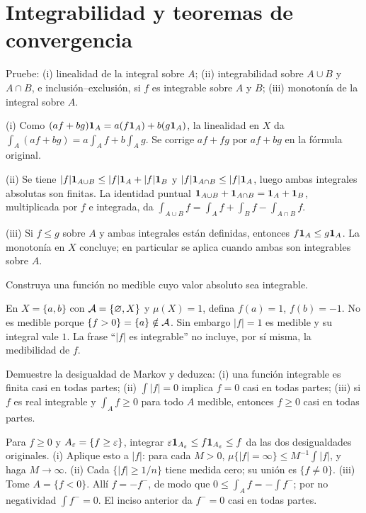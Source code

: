 \chapter{Integrabilidad y teoremas de convergencia}

\begin{ejercicio}\label{ej:v2-l09-1}
Pruebe: (i) linealidad de la integral sobre $A$; (ii) integrabilidad sobre $A\cup B$ y $A\cap B$, e inclusión--exclusión, si $f$ es integrable sobre $A$ y $B$; (iii) monotonía de la integral sobre $A$.
\end{ejercicio}
\begin{solucion}
(i) Como $(af+bg)\mathbf1_{A}=a(f\mathbf1_{A})+b(g\mathbf1_{A})$, la linealidad en $X$ da $\int_A(af+bg)=a\int_Af+b\int_Ag$. Se corrige $af+fg$ por $af+bg$ en la fórmula original.

(ii) Se tiene $|f|\mathbf1_{A\cup B}\le|f|\mathbf1_{A}+|f|\mathbf1_{B}$ y $|f|\mathbf1_{A\cap B}\le|f|\mathbf1_{A}$, luego ambas integrales absolutas son finitas. La identidad puntual $\mathbf1_{A\cup B}+\mathbf1_{A\cap B}=\mathbf1_{A}+\mathbf1_{B}$, multiplicada por $f$ e integrada, da $\int_{A\cup B}f=\int_Af+\int_Bf-\int_{A\cap B}f$.

(iii) Si $f\le g$ sobre $A$ y ambas integrales están definidas, entonces $f\mathbf1_{A}\le g\mathbf1_{A}$. La monotonía en $X$ concluye; en particular se aplica cuando ambas son integrables sobre $A$.
\end{solucion}

\begin{ejercicio}\label{ej:v2-l09-2}
Construya una función no medible cuyo valor absoluto sea integrable.
\end{ejercicio}
\begin{solucion}
En $X=\{a,b\}$ con $\mathcal A=\{\varnothing,X\}$ y $\mu(X)=1$, defina $f(a)=1$, $f(b)=-1$. No es medible porque $\{f>0\}=\{a\}\notin\mathcal A$. Sin embargo $|f|=1$ es medible y su integral vale $1$. La frase ``$|f|$ es integrable'' no incluye, por sí misma, la medibilidad de $f$.
\end{solucion}

\begin{ejercicio}\label{ej:v2-l09-3}
Demuestre la desigualdad de Markov y deduzca: (i) una función integrable es finita casi en todas partes; (ii) $\int|f|=0$ implica $f=0$ casi en todas partes; (iii) si $f$ es real integrable y $\int_Af\ge0$ para todo $A$ medible, entonces $f\ge0$ casi en todas partes.
\end{ejercicio}
\begin{solucion}
Para $f\ge0$ y $A_\varepsilon=\{f\ge\varepsilon\}$, integrar $\varepsilon\mathbf1_{A_\varepsilon}\le f\mathbf1_{A_\varepsilon}\le f$ da las dos desigualdades originales. (i) Aplique esto a $|f|$: para cada $M>0$, $\mu\{|f|=\infty\}\le M^{-1}\int|f|$, y haga $M\to\infty$. (ii) Cada $\{|f|\ge1/n\}$ tiene medida cero; su unión es $\{f\ne0\}$. (iii) Tome $A=\{f<0\}$. Allí $f=-f^-$, de modo que $0\le\int_Af=-\int f^-$; por no negatividad $\int f^-=0$. El inciso anterior da $f^-=0$ casi en todas partes.
\end{solucion}

